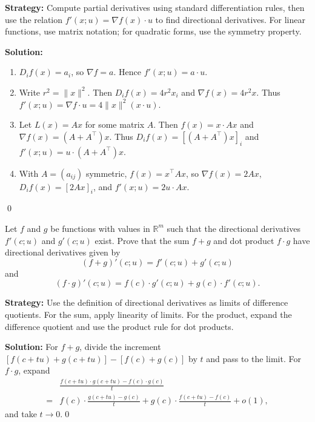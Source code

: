 \noindent\textbf{Strategy:} Compute partial derivatives using standard differentiation rules, then use the relation \( f'(x; u) = \nabla f(x) \cdot u \) to find directional derivatives. For linear functions, use matrix notation; for quadratic forms, use the symmetry property.

\bigskip\noindent\textbf{Solution:}
\begin{enumerate}[label=(\alph*)]
\item $D_i f(x)=a_i$, so $\nabla f=a$. Hence $f'(x;u)=a\cdot u$.
\item Write $r^2=\|x\|^2$. Then $D_i f(x)=4r^2 x_i$ and $\nabla f(x)=4r^2 x$. Thus $f'(x;u)=\nabla f\cdot u=4\|x\|^2(x\cdot u)$.
\item Let $L(x)=Ax$ for some matrix $A$. Then $f(x)=x\cdot Ax$ and $\nabla f(x)=(A+A^{\!\top})x$. Thus $D_i f(x)=[(A+A^{\!\top})x]_i$ and $f'(x;u)=u\cdot (A+A^{\!\top})x$.
\item With $A=(a_{ij})$ symmetric, $f(x)=x^{\!\top}Ax$, so $\nabla f(x)=2Ax$, $D_i f(x)=[2Ax]_i$, and $f'(x;u)=2u\cdot Ax$.
\end{enumerate}\qed


\begin{problembox}
\begin{problemstatement}
Let \( f \) and \( g \) be functions with values in \( \mathbb{R}^m \) such that the directional derivatives \( f'(c; u) \) and \( g'(c; u) \) exist. Prove that the sum \( f + g \) and dot product \( f \cdot g \) have directional derivatives given by
\[(f + g)'(c; u) = f'(c; u) + g'(c; u)\]
and
\[(f \cdot g)'(c; u) = f(c) \cdot g'(c; u) + g(c) \cdot f'(c; u).\]
\end{problemstatement}
\end{problembox}

\noindent\textbf{Strategy:} Use the definition of directional derivatives as limits of difference quotients. For the sum, apply linearity of limits. For the product, expand the difference quotient and use the product rule for dot products.

\bigskip\noindent\textbf{Solution:}
For $f+g$, divide the increment $[f(c+tu)+g(c+tu)]-[f(c)+g(c)]$ by $t$ and pass to the limit. For $f\cdot g$, expand
\begin{align*}
&\frac{f(c+tu)\cdot g(c+tu)-f(c)\cdot g(c)}{t} \\
=&f(c)\cdot\frac{g(c+tu)-g(c)}{t}+g(c)\cdot\frac{f(c+tu)-f(c)}{t}+o(1),
\end{align*}
and take $t\to0$.\qed


